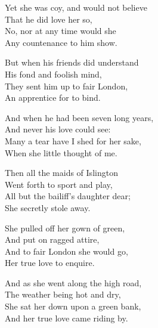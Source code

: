 \settowidth{\versewidth}{Yet she was coy, and would not believe}
\begin{dcverse}\begin{altverse}
Yet she was coy, and would not believe\\
That he did love her so,\\
No, nor at any time would she\\
Any countenance to him show.
\end{altverse}

\begin{altverse}
But when his friends did understand\\
His fond and foolish mind,\\
They sent him up to fair London,\\
An apprentice for to bind.
\end{altverse}

\begin{altverse}
And when he had been seven long years,\\
And never his love could see:\\
Many a tear have I shed for her sake,\\
When she little thought of me.
\end{altverse}

\begin{altverse}
Then all the maids of Islington\\
Went forth to sport and play,\\
All but the bailiff’s daughter dear;\\
She secretly stole away.
\end{altverse}

\begin{altverse}
She pulled off her gown of green,\\
And put on ragged attire,\\
And to fair London she would go,\\
Her true love to enquire.
\end{altverse}

\begin{altverse}
And as she went along the high road,\\
The weather being hot and dry,\\
She sat her down upon a green bank,\\
And her true love came riding by.
\end{altverse}
\end{dcverse}
\origpage{}%

